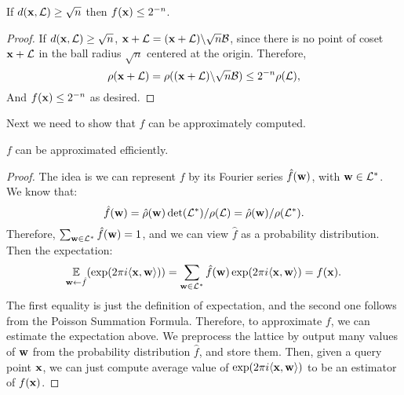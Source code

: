 \documentclass[11pt]{article}
\begin{document}
\begin{corollary}
  If $d(\mathbf{x},\mathcal{L}) \geq \sqrt{n}$ then $f(\mathbf{x}) \leq 2^{-n}$.
\end{corollary}

\begin{proof}
  If $d(\mathbf{x},\mathcal{L}) \geq \sqrt{n}$,
  $\mathbf{x} + \mathcal{L} = (\mathbf{x} + \mathcal{L}) \backslash \sqrt{n}\mathcal{B}$, since
  there is no point of coset $\mathbf{x} + \mathcal{L}$ in the ball radius
  $\sqrt{n}$ centered at the origin. Therefore,
  \[ \rho(\mathbf{x} + \mathcal{L}) = \rho((\mathbf{x} + \mathcal{L})\backslash \sqrt{n}\mathcal{B})
    \leq 2^{-n} \rho(\mathcal{L}), \] And $f(\mathbf{x}) \leq 2^{-n}$ as desired.
\end{proof}

Next we need to show that $f$ can be approximately computed.
\begin{lemma}
  $f$ can be approximated efficiently.
\end{lemma}

\begin{proof}
  The idea is we can represent $f$ by its Fourier series
  $\hat{f}(\mathbf{w})$, with $\mathbf{w} \in \mathcal{L}^*$. We know that:
  \[ \hat{f}(\mathbf{w}) = \hat{\rho}(\mathbf{w}) \det(\mathcal{L}^*) / \rho(\mathcal{L}) =
    \hat{\rho}(\mathbf{w})/\rho(\mathcal{L}^*).\] Therefore,
  $\sum_{\mathbf{w} \in \mathcal{L}^*} \hat{f}(\mathbf{w}) = 1$, and we can view
  $\hat{f}$ as a probability distribution. Then the expectation:
  \[ \operatorname*{\mathbb{E}}_{\mathbf{w} \leftarrow \hat{f}}(\exp(2 \pi i \langle\mathbf{x},\mathbf{w}\rangle ))
    = \sum_{\mathbf{w} \in \mathcal{L}^*}\hat{f}(\mathbf{w}) \exp(2 \pi i
    \langle\mathbf{x},\mathbf{w}\rangle ) = f(\mathbf{x}). \] The first equality is just
  the definition of expectation, and the second one follows from the
  Poisson Summation Formula. Therefore, to approximate $f$, we can
  estimate the expectation above. We preprocess the lattice by output
  many values of $\mathbf{w}$ from the probability distribution $\hat{f}$,
  and store them. Then, given a query point $\mathbf{x}$, we can just
  compute average value of $\exp(2 \pi i \langle\mathbf{x},\mathbf{w}\rangle )$ to be
  an estimator of $f(\mathbf{x})$.
\end{proof}



\end{document}
